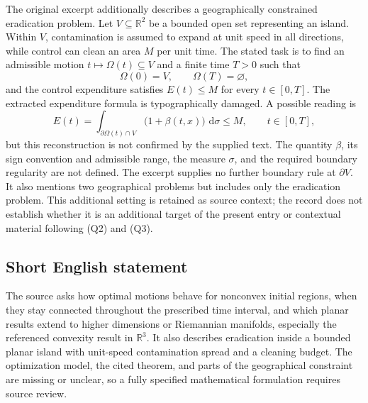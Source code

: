 \documentclass[11pt]{article}
\newcommand{\R}{\mathbb{R}}
\newcommand{\dd}{\,\mathrm{d}}
\begin{document}
The original excerpt additionally describes a geographically constrained eradication problem. Let \(V\subseteq\R^2\) be a bounded open set representing an island. Within \(V\), contamination is assumed to expand at unit speed in all directions, while control can clean an area \(M\) per unit time. The stated task is to find an admissible motion \(t\mapsto\Omega(t)\subseteq V\) and a finite time \(T>0\) such that
\[
\Omega(0)=V,\qquad \Omega(T)=\varnothing,
\]
and the control expenditure satisfies \(E(t)\leq M\) for every \(t\in[0,T]\). The extracted expenditure formula is typographically damaged. A possible reading is
\[
E(t)=\int_{\partial\Omega(t)\cap V}\bigl(1+\beta(t,x)\bigr)\,\dd\sigma\leq M,
\qquad t\in[0,T],
\]
but this reconstruction is not confirmed by the supplied text. The quantity \(\beta\), its sign convention and admissible range, the measure \(\sigma\), and the required boundary regularity are not defined. The excerpt supplies no further boundary rule at \(\partial V\). It also mentions two geographical problems but includes only the eradication problem. This additional setting is retained as source context; the record does not establish whether it is an additional target of the present entry or contextual material following (Q2) and (Q3).
\subsection{Short English statement}
The source asks how optimal motions behave for nonconvex initial regions, when they stay connected throughout the prescribed time interval, and which planar results extend to higher dimensions or Riemannian manifolds, especially the referenced convexity result in \(\R^3\). It also describes eradication inside a bounded planar island with unit-speed contamination spread and a cleaning budget. The optimization model, the cited theorem, and parts of the geographical constraint are missing or unclear, so a fully specified mathematical formulation requires source review.
\end{document}
